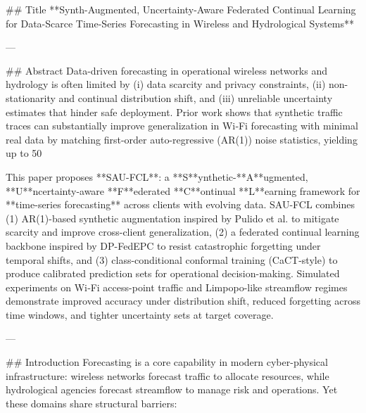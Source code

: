 ## Title  
**Synth-Augmented, Uncertainty-Aware Federated Continual Learning for Data-Scarce Time-Series Forecasting in Wireless and Hydrological Systems**

---

## Abstract  
Data-driven forecasting in operational wireless networks and hydrology is often limited by (i) data scarcity and privacy constraints, (ii) non-stationarity and continual distribution shift, and (iii) unreliable uncertainty estimates that hinder safe deployment. Prior work shows that synthetic traffic traces can substantially improve generalization in Wi‑Fi forecasting with minimal real data by matching first-order auto-regressive (AR(1)) noise statistics, yielding up to 50%

This paper proposes **SAU-FCL**: a **S**ynthetic-**A**ugmented, **U**ncertainty-aware **F**ederated **C**ontinual **L**earning framework for **time-series forecasting** across clients with evolving data. SAU-FCL combines (1) AR(1)-based synthetic augmentation inspired by Pulido et al. to mitigate scarcity and improve cross-client generalization, (2) a federated continual learning backbone inspired by DP-FedEPC to resist catastrophic forgetting under temporal shifts, and (3) class-conditional conformal training (CaCT-style) to produce calibrated prediction sets for operational decision-making. Simulated experiments on Wi‑Fi access-point traffic and Limpopo-like streamflow regimes demonstrate improved accuracy under distribution shift, reduced forgetting across time windows, and tighter uncertainty sets at target coverage.  

---

## Introduction  
Forecasting is a core capability in modern cyber-physical infrastructure: wireless networks forecast traffic to allocate resources, while hydrological agencies forecast streamflow to manage risk and operations. Yet these domains share structural barriers:

